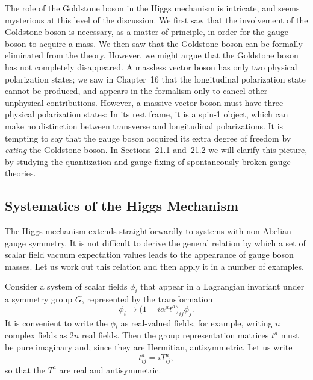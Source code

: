 The role of the Goldstone boson in the Higgs mechanism is intricate, and
seems mysterious at this level of the discussion.  We first saw that the
involvement of the Goldstone boson is necessary, as a matter of principle, in
order for the gauge boson to acquire a mass.  We then saw that the Goldstone
boson can be formally eliminated from the theory.  However, we might argue
that the Goldstone boson has not completely disappeared.  A massless vector
boson has only two physical polarization states; we saw in Chapter~16 that the
longitudinal polarization state cannot be produced, and appears in the
formalism only to cancel other unphysical contributions.  However, a massive
vector boson must have three physical polarization states: In its rest frame,
it is a spin-1 object, which can make no distinction between transverse and
longitudinal polarizations.  It is tempting to say that the gauge boson
acquired its extra degree of freedom by \emph{eating} the Goldstone boson.
In Sections~21.1 and~21.2 we will clarify this picture, by studying the
quantization and gauge-fixing of spontaneously broken gauge theories.

\subsection{Systematics of the Higgs Mechanism}

The Higgs mechanism extends straightforwardly to systems with non-Abelian
gauge symmetry.  It is not difficult to derive the general relation by which a
set of scalar field vacuum expectation values leads to the appearance of gauge
boson masses.  Let us work out this relation and then apply it in a number of
examples.

Consider a system of scalar fields $\phi_i$ that appear in a Lagrangian
invariant under a symmetry group $G$, represented by the transformation
\begin{equation}
  \phi_i \to \bigl( 1 + i\alpha^a t^a \bigr)_{ij}\phi_j .
  \label{eq:20.13}
\end{equation}
It is convenient to write the $\phi_i$ as real-valued fields, for example,
writing $n$ complex fields as $2n$ real fields.  Then the group
representation matrices $t^a$ must be pure imaginary and, since they are
Hermitian, antisymmetric.  Let us write
\begin{equation}
  t^a_{ij} = iT^a_{ij} ,
  \label{eq:20.14}
\end{equation}
so that the $T^a$ are real and antisymmetric.

